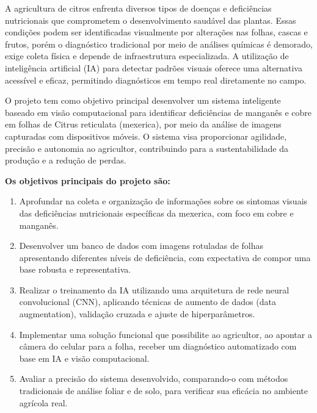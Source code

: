 A agricultura de citros enfrenta diversos tipos de doenças e deficiências nutricionais que comprometem o desenvolvimento saudável das plantas. Essas condições podem ser identificadas visualmente por alterações nas folhas, cascas e frutos, porém o diagnóstico tradicional por meio de análises químicas é demorado, exige coleta física e depende de infraestrutura especializada. A utilização de inteligência artificial (IA) para detectar padrões visuais oferece uma alternativa acessível e eficaz, permitindo diagnósticos em tempo real diretamente no campo.

O projeto tem como objetivo principal desenvolver um sistema inteligente baseado em visão computacional para identificar deficiências de manganês e cobre em folhas de Citrus reticulata (mexerica), por meio da análise de imagens capturadas com dispositivos móveis. O sistema visa proporcionar agilidade, precisão e autonomia ao agricultor, contribuindo para a sustentabilidade da produção e a redução de perdas.

\textbf{Os objetivos principais do projeto são:}
\begin{enumerate}
\item Aprofundar na coleta e organização de informações sobre os sintomas visuais das deficiências nutricionais específicas da mexerica, com foco em cobre e manganês.
\item Desenvolver um banco de dados com imagens rotuladas de folhas apresentando diferentes níveis de deficiência, com expectativa de compor uma base robusta e representativa.
\item Realizar o treinamento da IA utilizando uma arquitetura de rede neural convolucional (CNN), aplicando técnicas de aumento de dados (data augmentation), validação cruzada e ajuste de hiperparâmetros.
\item Implementar uma solução funcional que possibilite ao agricultor, ao apontar a câmera do celular para a folha, receber um diagnóstico automatizado com base em IA e visão computacional.
\item Avaliar a precisão do sistema desenvolvido, comparando-o com métodos tradicionais de análise foliar e de solo, para verificar sua eficácia no ambiente agrícola real.
\end{enumerate}

